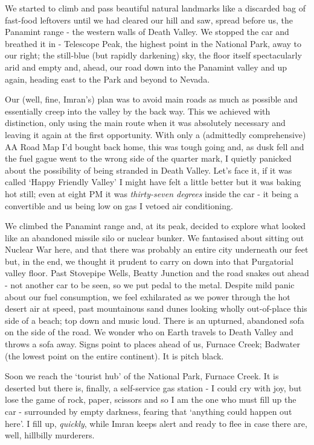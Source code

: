 \documentclass[a5paper,titlepage,11pt]{book}
\begin{document}
We started to climb and pass beautiful natural landmarks like a discarded bag of fast-food leftovers until we had cleared our hill and saw, spread before us, the Panamint range - the western walls of Death Valley.  We stopped the car and breathed it in - Telescope Peak, the highest point in the National Park, away to our right; the still-blue (but rapidly darkening) sky, the floor itself spectacularly arid and empty and, ahead, our road down into the Panamint valley and up again, heading east to the Park and beyond to Nevada.

Our (well, fine, Imran's) plan was to avoid main roads as much as possible and essentially creep into the valley by the back way.  This we achieved with distinction, only using the main route when it was absolutely necessary and leaving it again at the first opportunity.  With only a (admittedly comprehensive) AA Road Map I'd bought back home, this was tough going and, as dusk fell and the fuel gague went to the wrong side of the quarter mark, I quietly panicked about the possibility of being stranded in Death Valley.  Let's face it, if it was called `Happy Friendly Valley' I might have felt a little better but it was baking hot still; even at eight PM it was \emph{thirty-seven degrees} inside the car - it being a convertible and us being low on gas I vetoed air conditioning.

We climbed the Panamint range and, at its peak, decided to explore what looked like an abandoned missile silo or nuclear bunker.  We fantasised about sitting out Nuclear War here, and that there was probably an entire city underneath our feet but, in the end, we thought it prudent to carry on down into that Purgatorial valley floor.  Past Stovepipe Wells, Beatty Junction and the road snakes out ahead - not another car to be seen, so we put pedal to the metal.  Despite mild panic about our fuel consumption, we feel exhilarated as we power through the hot desert air at speed, past mountainous sand dunes looking wholly out-of-place this side of a beach; top down and music loud.  There is an upturned, abandoned sofa on the side of the road.  We wonder who on Earth travels to Death Valley and throws a sofa away.  Signs point to places ahead of us, Furnace Creek; Badwater (the lowest point on the entire continent).  It is pitch black.

Soon we reach the `tourist hub' of the National Park, Furnace Creek.  It is deserted but there is, finally, a self-service gas station - I could cry with joy, but lose the game of rock, paper, scissors and so I am the one who must fill up the car - surrounded by empty darkness, fearing that `anything could happen out here'.  I fill up, \emph{quickly}, while Imran keeps alert and ready to flee in case there are, well, hillbilly murderers.
\end{document}
